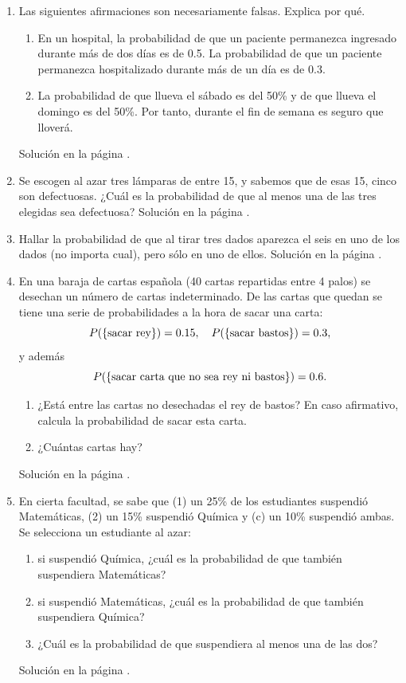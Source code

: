 \documentclass[10pt,a4paper]{article}\usepackage[]{graphicx}\usepackage[]{color}
\begin{document}
\begin{enumerate}
\item \label{tut03:ejercicio22} Las siguientes afirmaciones son necesariamente falsas. Explica por qué.
\begin{enumerate}
     \item En un hospital, la probabilidad de que un paciente permanezca ingresado durante m\'as de dos d\'ias  es de 0.5. La probabilidad de que un paciente permanezca hospitalizado durante m\'as de un d\'ia es de 0.3.
     \item La probabilidad de que llueva el s\'abado es del 50\% y de que llueva el domingo es del 50\%. Por tanto, durante el fin de semana es seguro que llover\'a.
\end{enumerate}
Solución en la página \pageref{tut03:ejercicio22:sol}. 



\item \label{tut03:ejercicio23} Se escogen al azar tres lámparas de entre 15, y sabemos que de esas 15, cinco son defectuosas. ¿Cuál es la probabilidad de que al menos una de las tres elegidas sea defectuosa? 
Solución en la página \pageref{tut03:ejercicio23:sol}.   

\item \label{tut03:ejercicio24} Hallar la probabilidad de que al tirar tres dados aparezca el seis en uno de los dados (no importa cual), pero sólo en uno de ellos.     
Solución en la página \pageref{tut03:ejercicio24:sol}. 


\item \label{tut03:ejercicio25} En una baraja de cartas espa\~nola (40 cartas repartidas entre 4 palos) se desechan un n\'umero de cartas indeterminado. De las cartas que quedan se tiene una serie de probabilidades a la hora de sacar una carta:
$$P(\{\hbox{sacar rey}\})=0.15,\quad P(\{\hbox{sacar bastos}\})=0.3,$$
y adem\'as
$$P(\{\hbox{sacar carta que no sea rey ni bastos}\})=0.6.$$
\begin{enumerate}
     \item ¿Est\'a entre las cartas no desechadas el rey de bastos? En caso afirmativo, calcula la probabilidad de sacar esta carta.
     \item ¿Cu\'antas cartas hay?
\end{enumerate}
Solución en la página \pageref{tut03:ejercicio25:sol}. 


\item  \label{tut03:ejercicio26}  En cierta facultad, se sabe que (1) un 25\% de los estudiantes suspendió Matemáticas, (2) un 15\% suspendió Química y (c) un 10\% suspendió ambas. Se selecciona un estudiante al azar:
\begin{enumerate}
\item si suspendió Química, ¿cuál es la probabilidad de que también suspendiera Matemáticas?
\item si suspendió Matemáticas, ¿cuál es la probabilidad de que también suspendiera Química?
\item ¿Cuál es la probabilidad de que suspendiera al menos una de las dos?
\end{enumerate}
Solución en la página \pageref{tut03:ejercicio26:sol}. 



\end{enumerate}
\end{document}
